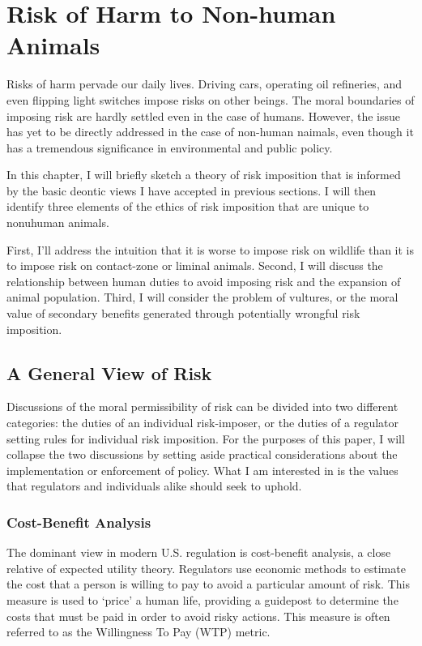 \chapter{Risk of Harm to Non-human Animals}

Risks of harm pervade our daily lives. Driving cars, operating oil refineries,
and even flipping light switches impose risks on other beings.  The moral
boundaries of imposing risk are hardly settled even in the case of humans.
However, the issue has yet to be directly addressed in the case of non-human
naimals, even though it has a tremendous significance in environmental and
public policy.

In this chapter, I will briefly sketch a theory of risk imposition that is
informed by the basic deontic views I have accepted in previous sections.  I
will then identify three elements of the ethics of risk imposition that are
unique to nonuhuman animals.

First, I’ll address the intuition that it is worse to impose risk on wildlife
than it is to impose risk on contact-zone or liminal animals.  Second, I will
discuss the relationship between human duties to avoid imposing risk and the
expansion of animal population.  Third, I will consider the problem of
vultures, or the moral value of secondary benefits generated through
potentially wrongful risk imposition.

\section{A General View of Risk}

Discussions of the moral permissibility of risk can be divided into two
different categories: the duties of an individual risk-imposer, or the duties
of a regulator setting rules for individual risk imposition. For the purposes
of this paper, I will collapse the two discussions by setting aside practical
considerations about the implementation or enforcement of policy. What I am
interested in is the values that regulators and individuals alike should seek
to uphold.

\subsection{Cost-Benefit Analysis}

The dominant view in modern U.S. regulation is cost-benefit analysis, a close
relative of expected utility theory. Regulators use economic methods to
estimate the cost that a person is willing to pay to avoid a particular amount
of risk.  This measure is used to ‘price’ a human life, providing a guidepost
to determine the costs that must be paid in order to avoid risky actions. This
measure is often referred to as the Willingness To Pay (WTP) metric.

